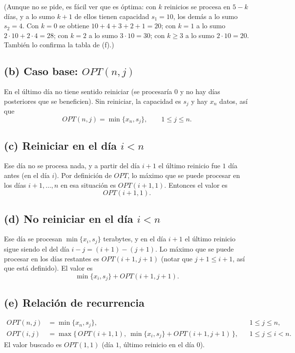 (Aunque no se pide, es fácil ver que es óptima: con $k$ reinicios se procesa en $5-k$ días, y a lo sumo $k+1$ de ellos tienen capacidad $s_1=10$, los demás a lo sumo $s_2=4$. Con $k=0$ se obtiene $10+4+3+2+1=20$; con $k=1$ a lo sumo $2\cdot 10+2\cdot 4=28$; con $k=2$ a lo sumo $3\cdot 10=30$; con $k\ge 3$ a lo sumo $2\cdot 10=20$. También lo confirma la tabla de (f).)

\subsection*{(b) Caso base: $OPT(n,j)$}

En el último día no tiene sentido reiniciar (se procesaría $0$ y no hay días posteriores que se beneficien). Sin reiniciar, la capacidad es $s_j$ y hay $x_n$ datos, así que
\[
OPT(n,j)=\min\{x_n,s_j\},\qquad 1\le j\le n.
\]

\subsection*{(c) Reiniciar en el día $i<n$}

Ese día no se procesa nada, y a partir del día $i+1$ el último reinicio fue $1$ día antes (en el día $i$). Por definición de $OPT$, lo máximo que se puede procesar en los días $i+1,\dots,n$ en esa situación es $OPT(i+1,1)$. Entonces el valor es
\[
OPT(i+1,1).
\]

\subsection*{(d) No reiniciar en el día $i<n$}

Ese día se procesan $\min\{x_i,s_j\}$ terabytes, y en el día $i+1$ el último reinicio sigue siendo el del día $i-j=(i+1)-(j+1)$. Lo máximo que se puede procesar en los días restantes es $OPT(i+1,j+1)$ (notar que $j+1\le i+1$, así que está definido). El valor es
\[
\min\{x_i,s_j\}+OPT(i+1,j+1).
\]

\subsection*{(e) Relación de recurrencia}

\begin{align}
OPT(n,j) &= \min\{x_n,s_j\}, && 1\le j\le n, \label{e3:b}\\
OPT(i,j) &= \max\bigl\{\, OPT(i+1,1),\ \min\{x_i,s_j\}+OPT(i+1,j+1)\,\bigr\}, && 1\le j\le i<n. \label{e3:rec}
\end{align}
El valor buscado es $OPT(1,1)$ (día $1$, último reinicio en el día $0$).

